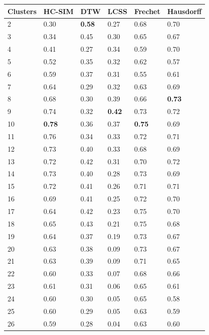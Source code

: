 \documentclass[a4paper, 12pt]{article}
\begin{document}
\begin{tabularx}{\linewidth}{|X|X|X|X|X|X|}
    \caption{Mopsi Silhouette Scores.} \\
    \hline \textbf{Clusters} & \textbf{HC-SIM} & \textbf{DTW} & \textbf{LCSS} & \textbf{Frechet} & \textbf{Hausdorff} \\
    \hline
    \hline
        2 & 0.30 & \textbf{0.58} & 0.27 & 0.68 & 0.70 \\
        3 & 0.34 & 0.45 & 0.30 & 0.65 & 0.67 \\
        4 & 0.41 & 0.27 & 0.34 & 0.59 & 0.70 \\
        5 & 0.52 & 0.35 & 0.32 & 0.62 & 0.57 \\
        6 & 0.59 & 0.37 & 0.31 & 0.55 & 0.61 \\
        7 & 0.64 & 0.29 & 0.32 & 0.63 & 0.69 \\
        8 & 0.68 & 0.30 & 0.39 & 0.66 & \textbf{0.73} \\
        9 & 0.74 & 0.32 & \textbf{0.42} & 0.73 & 0.72 \\
        10 & \textbf{0.78} & 0.36 & 0.37 & \textbf{0.75} & 0.69 \\
        11 & 0.76 & 0.34 & 0.33 & 0.72 & 0.71 \\
        12 & 0.73 & 0.40 & 0.33 & 0.68 & 0.69 \\
        13 & 0.72 & 0.42 & 0.31 & 0.70 & 0.72 \\
        14 & 0.73 & 0.40 & 0.28 & 0.73 & 0.69 \\
        15 & 0.72 & 0.41 & 0.26 & 0.71 & 0.71 \\
        16 & 0.69 & 0.41 & 0.25 & 0.72 & 0.70 \\
        17 & 0.64 & 0.42 & 0.23 & 0.75 & 0.70 \\
        18 & 0.65 & 0.43 & 0.21 & 0.75 & 0.68 \\
        19 & 0.64 & 0.37 & 0.19 & 0.73 & 0.67 \\
        20 & 0.63 & 0.38 & 0.09 & 0.73 & 0.67 \\
        21 & 0.63 & 0.39 & 0.09 & 0.71 & 0.65 \\
        22 & 0.60 & 0.33 & 0.07 & 0.68 & 0.66 \\
        23 & 0.61 & 0.31 & 0.06 & 0.65 & 0.61 \\
        24 & 0.60 & 0.30 & 0.05 & 0.65 & 0.58 \\
        25 & 0.60 & 0.29 & 0.05 & 0.63 & 0.59 \\
        26 & 0.59 & 0.28 & 0.04 & 0.63 & 0.60 \\

\end{tabularx}
\end{document}
